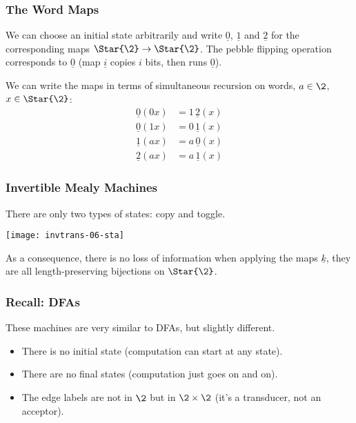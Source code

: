 \documentclass[handout,10pt]{ksbeamer}
\let\emph=\alert
\def\twost{\Star{\2}}
\def\SS{\Star{\2}}
\def\F#1{\underline{#1}}
\begin{document}
\begin{frame}
\frametitle{The Word Maps}

We can choose an initial state arbitrarily and write  $\F{0}$, $\F{1}$ and $\F{2}$ for 
the corresponding maps $\SS \to \SS$. 
The pebble flipping operation corresponds to $\F{0}$
(map $\F{i}$ copies $i$ bits, then runs $\F{0}$).
\vspace{3ex}

We can write the maps in terms of simultaneous recursion on words, 
$a \in \2$, $x \in \twost$: 
\begin{align*}
    \F{0}(0x) &=  1 \, \F{2}(x) \\[1ex]
    \F{0}(1x) &=  0 \, \F{1}(x) \\[1ex]
    \F{1}(ax) &=  a \, \F{0}(x) \\[1ex]
    \F{2}(ax) &=  a \, \F{1}(x) 
\end{align*}

\end{frame}

\begin{frame}
\frametitle{Invertible Mealy Machines}

There are only two types of states:  \emph{copy} and \emph{toggle}.

\begin{center}
\texttt{[image: invtrans-06-sta]}
\end{center}
\vspace{3ex}

As a consequence, there is no loss of information when applying the maps $\F{k}$,
they are all length-preserving bijections on $\SS$. 
\vspace{1ex} 


\end{frame}

\begin{frame}
\frametitle{Recall: DFAs}

These machines are very similar to DFAs, but slightly different.
\vspace{3ex}

\begin{itemize}
\addtolength{\itemsep}{2mm}
\item  There is no initial state (computation can start at any state). 
\item  There are no final states (computation just goes on and on). 
\item The edge labels are not in $\2$ but in $\2 \times \2$ (it's a transducer, not
  an acceptor).
\end{itemize}

\end{frame}
\end{document}
